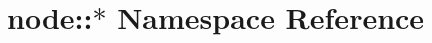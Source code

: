 \hypertarget{namespacenode_1_1_5}{
\section{node::$\ast$ Namespace Reference}
\label{namespacenode_1_1_5}
}


